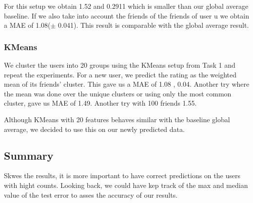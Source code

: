 For this setup  we obtain  1.52 and 0.2911 which is smaller than our global average baseline.
If we also take into account the friends of the friends of user u we obtain  a MAE of 1.08($\pm$ 0.041). This result is comparable with the global average result.

\subsubsection{KMeans}
We cluster the users into 20 groups using the KMeans setup from Task 1
and repeat the experiments. For a new user, we predict the rating as the weighted mean of its friends' cluster. This gave us a MAE of
1.08 , 0.04.
Another try where the mean was done over the unique clusters or using only the most common cluster, gave us MAE of 1.49.
Another try with 100 friends 1.55.

Although KMeans with 20 features behaves similar with the baseline global average, we decided to use this on our newly predicted data.

\subsection{Summary}
Skwes the results, it is more important to have correct predictions on the users with hight counts. Looking back, we could have kep track of the max and median value of the test error to asses the accuracy of our results.
